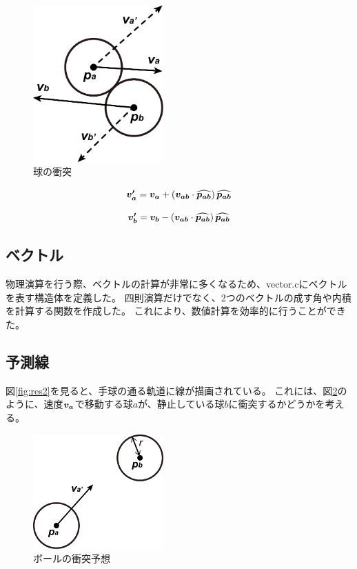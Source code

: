 \documentclass[a4j,titlepage]{jsarticle}
\newcommand{\bvec}[1]{\mbox{\boldmath $#1$}}
\begin{document}
\begin{figure}[H]
  \centering
  \includegraphics[width=5cm]{球の衝突.pdf}
  \caption{球の衝突}
  \label{fig:parts}
\end{figure}

\begin{equation}
  \bvec{v_a'} = \bvec{v_a} + \left( \bvec{v_{ab}} \cdot \widehat{\bvec{p_{ab}}} \right) \widehat{\bvec{p_{ab}}}
  \label{eq:va}
\end{equation}

\begin{equation}
  \bvec{v_b'} = \bvec{v_b} - \left( \bvec{v_{ab}} \cdot \widehat{\bvec{p_{ab}}} \right) \widehat{\bvec{p_{ab}}}
  \label{eq:vb}
\end{equation}

\subsection{ベクトル}
物理演算を行う際、ベクトルの計算が非常に多くなるため、vector.cにベクトルを表す構造体を定義した。
四則演算だけでなく、2つのベクトルの成す角や内積を計算する関数を作成した。
これにより、数値計算を効率的に行うことができた。

\subsection{予測線}
図\ref{fig:res2}を見ると、手球の通る軌道に線が描画されている。
これには、図\ref{fig:pre}のように、速度$\bvec{v_a}$で移動する球$a$が、静止している球$b$に衝突するかどうかを考える。

\begin{figure}[H]
  \centering
  \includegraphics[width=5cm]{predict.pdf}
  \caption{ボールの衝突予想}
  \label{fig:pre}
\end{figure}
\end{document}
